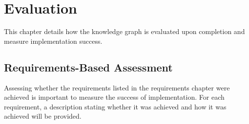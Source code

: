 \chapter{Evaluation}
This chapter details how the knowledge graph is evaluated upon completion and measure implementation success.

\section{Requirements-Based Assessment}
\hspace{0.5cm} Assessing whether the requirements listed in the requirements chapter were achieved is important to measure the success of implementation. For each requirement, a description stating whether it was achieved and how it was achieved will be provided. 

